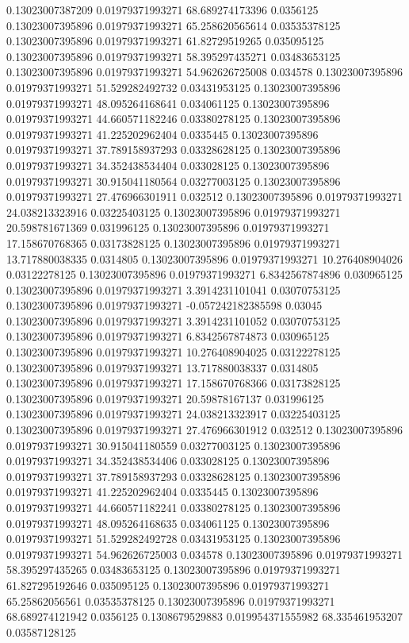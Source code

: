 0.13023007387209 0.01979371993271 68.689274173396 0.0356125
0.13023007395896 0.01979371993271 65.258620565614 0.03535378125
0.13023007395896 0.01979371993271 61.82729519265 0.035095125
0.13023007395896 0.01979371993271 58.395297435271 0.03483653125
0.13023007395896 0.01979371993271 54.962626725008 0.034578
0.13023007395896 0.01979371993271 51.529282492732 0.03431953125
0.13023007395896 0.01979371993271 48.095264168641 0.034061125
0.13023007395896 0.01979371993271 44.660571182246 0.03380278125
0.13023007395896 0.01979371993271 41.225202962404 0.0335445
0.13023007395896 0.01979371993271 37.789158937293 0.03328628125
0.13023007395896 0.01979371993271 34.352438534404 0.033028125
0.13023007395896 0.01979371993271 30.915041180564 0.03277003125
0.13023007395896 0.01979371993271 27.476966301911 0.032512
0.13023007395896 0.01979371993271 24.038213323916 0.03225403125
0.13023007395896 0.01979371993271 20.598781671369 0.031996125
0.13023007395896 0.01979371993271 17.158670768365 0.03173828125
0.13023007395896 0.01979371993271 13.717880038335 0.0314805
0.13023007395896 0.01979371993271 10.276408904026 0.03122278125
0.13023007395896 0.01979371993271 6.8342567874896 0.030965125
0.13023007395896 0.01979371993271 3.3914231101041 0.03070753125
0.13023007395896 0.01979371993271 -0.057242182385598 0.03045
0.13023007395896 0.01979371993271 3.3914231101052 0.03070753125
0.13023007395896 0.01979371993271 6.8342567874873 0.030965125
0.13023007395896 0.01979371993271 10.276408904025 0.03122278125
0.13023007395896 0.01979371993271 13.717880038337 0.0314805
0.13023007395896 0.01979371993271 17.158670768366 0.03173828125
0.13023007395896 0.01979371993271 20.59878167137 0.031996125
0.13023007395896 0.01979371993271 24.038213323917 0.03225403125
0.13023007395896 0.01979371993271 27.476966301912 0.032512
0.13023007395896 0.01979371993271 30.915041180559 0.03277003125
0.13023007395896 0.01979371993271 34.352438534406 0.033028125
0.13023007395896 0.01979371993271 37.789158937293 0.03328628125
0.13023007395896 0.01979371993271 41.225202962404 0.0335445
0.13023007395896 0.01979371993271 44.660571182241 0.03380278125
0.13023007395896 0.01979371993271 48.095264168635 0.034061125
0.13023007395896 0.01979371993271 51.529282492728 0.03431953125
0.13023007395896 0.01979371993271 54.962626725003 0.034578
0.13023007395896 0.01979371993271 58.395297435265 0.03483653125
0.13023007395896 0.01979371993271 61.827295192646 0.035095125
0.13023007395896 0.01979371993271 65.25862056561 0.03535378125
0.13023007395896 0.01979371993271 68.689274121942 0.0356125
0.1308679529883 0.019954371555982 68.335461953207 0.03587128125
